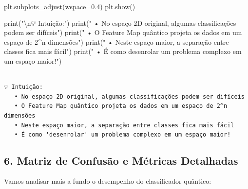 \documentclass[
  brazilian,
]{report}
\newenvironment{Shaded}{\begin{snugshade}}{\end{snugshade}}
\newcommand{\BuiltInTok}[1]{\textcolor[rgb]{0.00,0.23,0.31}{#1}}
\newcommand{\CharTok}[1]{\textcolor[rgb]{0.13,0.47,0.30}{#1}}
\newcommand{\FloatTok}[1]{\textcolor[rgb]{0.68,0.00,0.00}{#1}}
\newcommand{\NormalTok}[1]{\textcolor[rgb]{0.00,0.23,0.31}{#1}}
\newcommand{\OperatorTok}[1]{\textcolor[rgb]{0.37,0.37,0.37}{#1}}
\newcommand{\StringTok}[1]{\textcolor[rgb]{0.13,0.47,0.30}{#1}}
\begin{document}
\begin{tcolorbox}
\begin{Shaded}
\begin{Highlighting}[]
\NormalTok{plt.subplots\_adjust(wspace}\OperatorTok{=}\FloatTok{0.4}\NormalTok{)}
\NormalTok{plt.show()}

\BuiltInTok{print}\NormalTok{(}\StringTok{"}\CharTok{\textbackslash{}n}\StringTok{💡 Intuição:"}\NormalTok{)}
\BuiltInTok{print}\NormalTok{(}\StringTok{"   • No espaço 2D original, algumas classificações podem ser difíceis"}\NormalTok{)}
\BuiltInTok{print}\NormalTok{(}\StringTok{"   • O Feature Map quântico projeta os dados em um espaço de 2\^{}n dimensões"}\NormalTok{)}
\BuiltInTok{print}\NormalTok{(}\StringTok{"   • Neste espaço maior, a separação entre classes fica mais fácil"}\NormalTok{)}
\BuiltInTok{print}\NormalTok{(}\StringTok{"   • É como \textquotesingle{}desenrolar\textquotesingle{} um problema complexo em um espaço maior!"}\NormalTok{)}
\end{Highlighting}
\end{Shaded}

\end{tcolorbox}

\begin{verbatim}

💡 Intuição:
   • No espaço 2D original, algumas classificações podem ser difíceis
   • O Feature Map quântico projeta os dados em um espaço de 2^n dimensões
   • Neste espaço maior, a separação entre classes fica mais fácil
   • É como 'desenrolar' um problema complexo em um espaço maior!
\end{verbatim}

\subsection{6. Matriz de Confusão e Métricas
Detalhadas}\label{matriz-de-confusuxe3o-e-muxe9tricas-detalhadas}

Vamos analisar mais a fundo o desempenho do classificador quântico:
\end{document}
